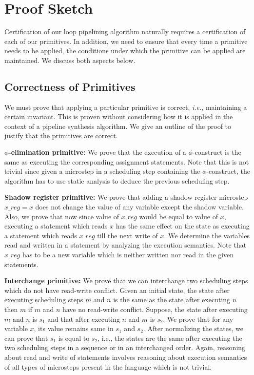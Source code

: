 \chapter{Proof Sketch}
\label{sec:proof}

Certification of our loop pipelining algorithm naturally requires a certification of each of our primitives.
In addition, we need to ensure that every time a primitive needs to be applied, the conditions
under which the primitive can be applied are maintained. We discuss both aspects below.

\section{Correctness of Primitives}
We must prove that applying a particular primitive is correct, {\em i.e.},
maintaining a certain invariant. This is proven without
considering how it is applied in the context of a pipeline
synthesis algorithm. We give an outline of the proof to justify that the primitives are correct.

{\bf $\phi$-elimination primitive:} We prove that the execution
  of a $\phi$-construct is the same as executing the corresponding
  assignment statements. Note that this is not trivial since
  given a microstep in a scheduling step containing the
  $\phi$-construct, the algorithm has to use static analysis
  to deduce the previous scheduling step.

{\bf Shadow register primitive:} We prove that adding
  a shadow register microstep $x\_reg = x$ does not change the
  value of any variable except the shadow variable. Also, we
  prove that now since value of $x\_reg$ would be equal to value
  of $x$, executing a statement which reads $x$ has the same
  effect on the state as executing a statement which reads
  $x\_reg$ till the next write of $x$. We
  determine the variables read and written in a statement by
  analyzing the execution semantics. Note that $x\_reg$ has to be a new variable which
  is neither written nor read in the given statements.

{\bf Interchange primitive:} We prove that we can interchange two scheduling steps which do not have
  read-write conflict. Given an initial state, the state after
  executing scheduling steps $m$ and $n$ is the same as the state after
  executing $n$ then $m$ if $m$ and $n$ have no read-write
  conflict. Suppose, the state after
  executing $m$ and $n$ is $s_1$ and that after executing $n$ and
  $m$ is $s_2$. We prove that for any variable $x$, its
  value remains same in $s_1$ and $s_2$. After normalizing
  the states, we can prove that $s_1$ is equal to $s_2$, i.e.,
  the states are the same after executing the two scheduling steps in
  a sequence or in an interchanged order. Again, reasoning about read and
  write of statements involves reasoning about execution
  semantics of all types of microsteps present in the
  language which is not trivial.

